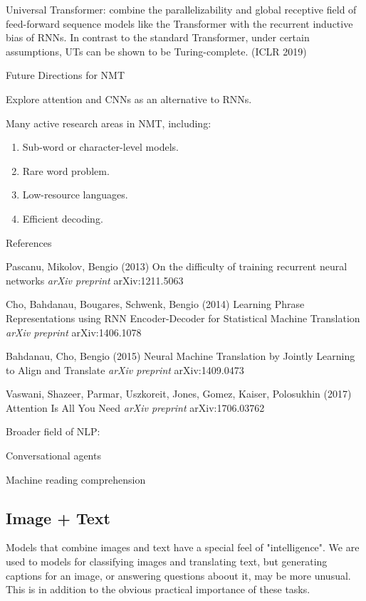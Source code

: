 \documentclass[english]{article}
\begin{document}
Universal Transformer: combine the parallelizability and global receptive field of feed-forward sequence models like the Transformer with the recurrent inductive bias of RNNs. In contrast to the standard Transformer, under certain assumptions, UTs can be shown to be Turing-complete. (ICLR 2019)


\item 
 {Future Directions for NMT}

Explore attention and CNNs as an alternative to RNNs.
 
Many active research areas in NMT, including:
\begin{enumerate}
\item Sub-word or character-level models.
\item Rare word problem.
\item Low-resource languages.
\item Efficient decoding.
\end{enumerate}

\item {References}

Pascanu, Mikolov, Bengio (2013) {On the difficulty of training recurrent neural networks}
 {\emph{arXiv preprint} arXiv:1211.5063}
 
Cho, Bahdanau, Bougares, Schwenk, Bengio (2014)
  {
  Learning Phrase Representations using RNN Encoder-Decoder for Statistical Machine Translation}
  {\emph{arXiv preprint} arXiv:1406.1078}
 
Bahdanau, Cho, Bengio (2015)
  {Neural Machine Translation by Jointly Learning to Align and Translate}
 {\emph{arXiv preprint} arXiv:1409.0473}
 
 Vaswani, Shazeer, Parmar, Uszkoreit, Jones, Gomez, Kaiser, Polosukhin (2017)
 {Attention Is All You Need}
 {\emph{arXiv preprint} arXiv:1706.03762}


\item Broader field of NLP: 

Conversational agents

Machine reading comprehension

\eenum

\subsection{Image + Text}


\benum
\item Models that combine images and text have a special feel of "intelligence". We are used to models for classifying images and translating text, but generating captions for an image, or answering questions aboout it, may be more unusual. This is in addition to the obvious practical importance of these tasks. 
\end{document}
